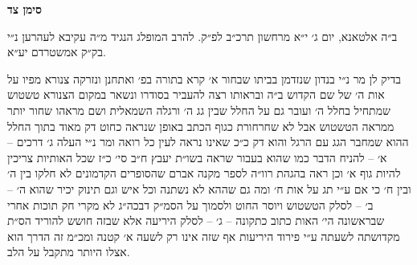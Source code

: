 \documentclass[12pt, openany]{book}
\newcommand{\chapname}{}
\newcommand{\newchap}[1]{
	\addcontentsline{toc}{chapter}{#1}
	\renewcommand{\chapname}{#1}
		\begin{center}
			\textbf{%
\fontsize{16pt}{16pt}\selectfont
				#1}
		\end{center}
}
\begin{document}
\newchap{סימן צד}
\begin{multicols}{2}
ב״ה אלטאנא, יום ג׳ י״א מרחשון תרכ״ב לפ״ק. להרב המופלג הנגיד מ״ה עקיבא לעהרען נ״י בק״ק אמשטרדם יע״א.\\\vspace{0pt}

בדיק לן מר נ״י בנדון שנזדמן בביתו שבחור א׳ קרא בתורה בפ׳ ואתחנן ונזרקה צנורא מפיו על אות ה׳ של שם הקדוש ב״ה ובראותו רצה להעביר בסודרו ונשאר במקום הצנורא טשטוש שמתחיל בחלל ה׳ ועובר גם על החלל שבין גג ה׳ ורגלה השמאלית ושם מראהו שחור יותר ממראה הטשטוש אבל לא שחרחורת כגוף הכתב באופן שנראה כחוט דק מאוד בתוך החלל ההוא שמחבר הגג עם הרגל והוא דק כ״כ שאינו נראה לעין כל רואה ומר נ״י העלה ג׳ דרכים – א׳ – להניח הדבר כמו שהוא בעבור שראה בשו״ת יעבץ ח״ב סי׳ כ״ז שכל האותיות צריכין להיות גוף א׳ וכן ראה בהגהת רוו״ה לספר מקנה אברם שהסופרים הקדמונים לא חלקו בין ה׳ ובין ח׳ כי אם ע״י תג על אות ח׳ ומה גם שההא לא נשתנה וכל איש וגם תינוק יכיר שהוא ה׳ – ב׳ – לסלק הטשטוש ויוסר החוט ולסמוך על הסמ״ק דבכה״ג לא מקרי חק תוכות אחרי שבראשונה הי׳ האות כתוב כתקונה – ג׳ – לסלק היריעה אלא שבזה חושש להוריד הס״ת מקדושתה לשעתה ע״י פירוד היריעות אף שזה אינו רק לשעה א׳ קטנה ומכ״מ זה הדרך הוא אצלו היותר מתקבל על הלב.\\\vspace{0pt}


\end{multicols}
\end{document}
